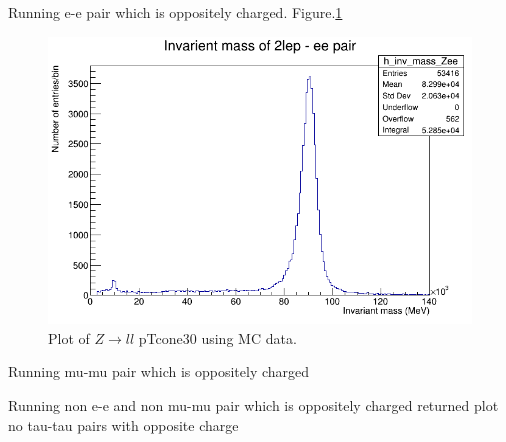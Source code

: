 Running e-e pair which is oppositely charged. Figure.\ref{fig:2lep_ee-pair_0-140GeV_11-02-21_16-12} 

\begin{figure}[h!]
    \centering
	\includegraphics[width=\linewidth]{plots/11-02-2021/2lep-fast_ee-pair_inv-mass_0-140GeV_11-02-21_16-12.png}
	\caption{Plot of $Z \rightarrow ll$ pTcone30 using MC data. 
	}\label{fig:2lep_ee-pair_0-140GeV_11-02-21_16-12}
\end{figure}

Running mu-mu pair which is oppositely charged

Running non e-e and non mu-mu pair which is oppositely charged 
 returned plot no tau-tau pairs with opposite charge 
 